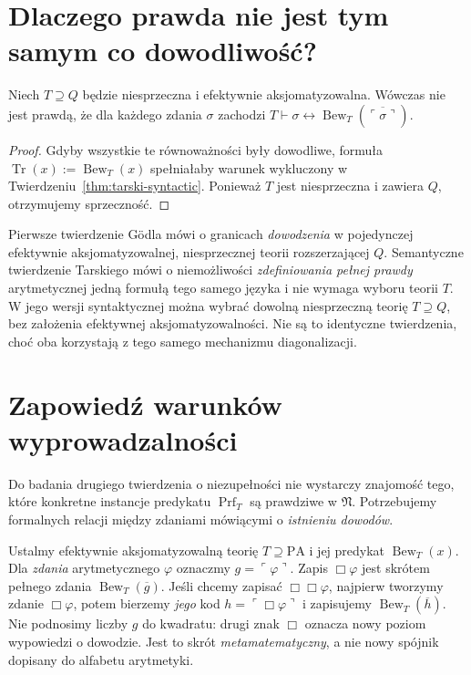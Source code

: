 \section{Dlaczego prawda nie jest tym samym co dowodliwość?}
\begin{twierdzenie}
Niech $T\supseteq Q$ będzie niesprzeczna i efektywnie
aksjomatyzowalna. Wówczas nie jest prawdą, że dla każdego
zdania $\sigma$ zachodzi
$T\vdash\sigma\leftrightarrow
\operatorname{Bew}_T(\overline{\ulcorner\sigma\urcorner})$.
\end{twierdzenie}
\begin{proof}
Gdyby wszystkie te równoważności były dowodliwe,
formuła $\operatorname{Tr}(x):=\operatorname{Bew}_T(x)$
spełniałaby warunek wykluczony w
Twierdzeniu~\ref{thm:tarski-syntactic}. Ponieważ $T$
jest niesprzeczna i zawiera $Q$, otrzymujemy sprzeczność.
\end{proof}

\begin{uwaga}
Pierwsze twierdzenie Gödla mówi o granicach
\emph{dowodzenia} w pojedynczej efektywnie aksjomatyzowalnej,
niesprzecznej teorii rozszerzającej $Q$.
Semantyczne twierdzenie Tarskiego mówi o niemożliwości
\emph{zdefiniowania pełnej prawdy} arytmetycznej
jedną formułą tego samego języka i nie wymaga wyboru
teorii $T$. W jego wersji syntaktycznej można wybrać
dowolną niesprzeczną teorię $T\supseteq Q$,
bez założenia efektywnej aksjomatyzowalności. Nie są to identyczne twierdzenia,
choć oba korzystają z tego samego mechanizmu diagonalizacji.
\end{uwaga}

\section{Zapowiedź warunków wyprowadzalności}
Do badania drugiego twierdzenia o niezupełności
nie wystarczy znajomość tego, które konkretne
instancje predykatu $\operatorname{Prf}_T$
są prawdziwe w $\mathfrak N$.
Potrzebujemy formalnych relacji między zdaniami
mówiącymi o \emph{istnieniu dowodów}.

\begin{definicja}\label{def:box-provability}
Ustalmy efektywnie aksjomatyzowalną teorię
$T\supseteq\mathrm{PA}$ i jej predykat
$\operatorname{Bew}_T(x)$.
Dla \emph{zdania} arytmetycznego $\varphi$ oznaczmy
$g=\ulcorner\varphi\urcorner$.
Zapis $\Box\varphi$ jest skrótem pełnego zdania
$\operatorname{Bew}_T(\overline g)$.
Jeśli chcemy zapisać $\Box\Box\varphi$, najpierw
tworzymy zdanie $\Box\varphi$, potem bierzemy
\emph{jego} kod $h=\ulcorner\Box\varphi\urcorner$
i zapisujemy $\operatorname{Bew}_T(\overline h)$.
Nie podnosimy liczby $g$ do kwadratu: drugi znak $\Box$
oznacza nowy poziom wypowiedzi o dowodzie.
Jest to skrót \emph{metamatematyczny}, a nie nowy
spójnik dopisany do alfabetu arytmetyki.
\end{definicja}

